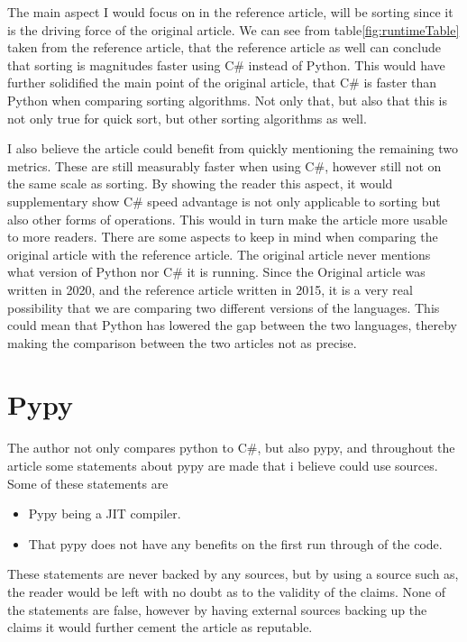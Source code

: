 \documentclass{article}
\begin{document}
The main aspect I would focus on in the reference article, will be sorting since it is the driving force of the original article. We can see from table\ref{fig:runtimeTable} taken from the reference article, that the reference article as well can conclude that sorting is magnitudes faster using C\# instead of Python. This would have further solidified the main point of the original article, that C\# is faster than Python when comparing sorting algorithms. Not only that, but also that this is not only true for quick sort, but other sorting algorithms as well.

I also believe the article could benefit from quickly mentioning the remaining two metrics. These are still measurably faster when using C\#, however still not on the same scale as sorting. By showing the reader this aspect, it would supplementary show C\# speed advantage is not only applicable to sorting but also other forms of operations. This would in turn make the article more usable to more readers. 
There are some aspects to keep in mind when comparing the original article with the reference article. The original article never mentions what version of Python nor C\# it is running. Since the Original article was written in 2020, and the reference article written in 2015, it is a very real possibility that we are comparing two different versions of the languages. This could mean that Python has lowered the gap between the two languages, thereby making the comparison between the two articles not as precise. 

\section*{Pypy}

The author not only compares python to C\#, but also pypy, and throughout the article some statements about pypy are made that i believe could use sources. Some of these statements are
\begin{itemize}
  \item Pypy being a JIT compiler.
  \item That pypy does not have any benefits on the first run through of the code.
\end{itemize}
These statements are never backed by any sources, but by using a source such as\cite{pypy}, the reader would be left with no doubt as to the validity of the claims. None of the statements are false, however by having external sources backing up the claims it would further cement the article as reputable.
\end{document}

